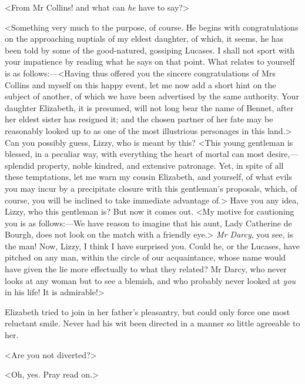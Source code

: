 <From Mr Collins! and what can \textit{he} have to say?>

<Something very much to the purpose, of course. He begins with congratulations on the approaching nuptials of my eldest daughter, of which, it seems, he has been told by some of the good-natured, gossiping Lucases. I shall not sport with your impatience by reading what he says on that point. What relates to yourself is as follows:—<Having thus offered you the sincere congratulations of Mrs Collins and myself on this happy event, let me now add a short hint on the subject of another, of which we have been advertised by the same authority. Your daughter Elizabeth, it is presumed, will not long bear the name of Bennet, after her eldest sister has resigned it; and the chosen partner of her fate may be reasonably looked up to as one of the most illustrious personages in this land.> Can you possibly guess, Lizzy, who is meant by this? <This young gentleman is blessed, in a peculiar way, with everything the heart of mortal can most desire,—splendid property, noble kindred, and extensive patronage. Yet, in spite of all these temptations, let me warn my cousin Elizabeth, and yourself, of what evils you may incur by a precipitate closure with this gentleman's proposals, which, of course, you will be inclined to take immediate advantage of.> Have you any idea, Lizzy, who this gentleman is? But now it comes out. <My motive for cautioning you is as follows:—We have reason to imagine that his aunt, Lady Catherine de Bourgh, does not look on the match with a friendly eye.> \textit{Mr Darcy}, you see, is the man! Now, Lizzy, I think I have surprised you. Could he, or the Lucases, have pitched on any man, within the circle of our acquaintance, whose name would have given the lie more effectually to what they related? Mr Darcy, who never looks at any woman but to see a blemish, and who probably never looked at \textit{you} in his life! It is admirable!>

Elizabeth tried to join in her father's pleasantry, but could only force one most reluctant smile. Never had his wit been directed in a manner so little agreeable to her.

<Are you not diverted?>

<Oh, yes. Pray read on.>

